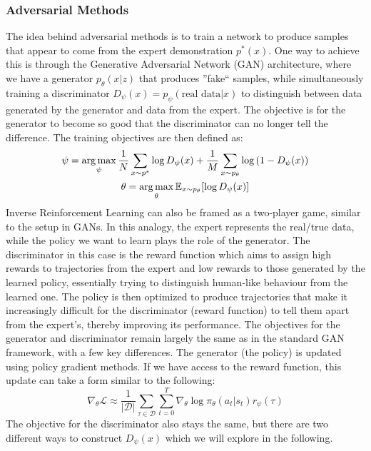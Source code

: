 \subsubsection{Adversarial Methods}
The idea behind adversarial methods is to train a network to produce samples that appear 
to come from the expert demonstration $p^*(x)$. One way to achieve this is through the  
Generative Adversarial Network (GAN) architecture, where we have a generator $p_\theta(x|z)$ that produces 
''fake`` samples, while simultaneously training a discriminator $D_\psi(x) = p_\psi(\text{real data}|x)$ to distinguish between 
data generated by the generator and data from the expert. The objective is for the generator to 
become so good that the discriminator can no longer tell the difference. The training objectives are then defined as:
\begin{gather*}
    \psi = \operatorname*{arg\,max}\limits_\psi \frac{1}{N} \sum_{x\sim p^*} \log{D_\psi(x)} + \frac{1}{M} \sum_{x\sim p_\theta}\log{(1-D_\psi(x))} \\
    \theta = \operatorname*{arg\,max}\limits_\theta \mathbb{E}_{x\sim p_\theta}[\log{D_\psi(x)}]
\end{gather*}
Inverse Reinforcement Learning can also be framed as a two-player game, similar to the setup
in GANs. In this analogy, the expert represents the real/true data, while the policy we want to learn
plays the role of the generator. The discriminator in this case is the reward function which aims to 
assign high rewards to trajectories from the expert and low rewards to those generated by the learned policy,
essentially trying to distinguish human-like behaviour from the learned one. The policy is then optimized to
produce trajectories that make it increasingly difficult for the discriminator (reward function) to 
tell them apart from the expert’s, thereby improving its performance. The objectives for the generator and discriminator
remain largely the same as in the standard GAN framework, with a few key differences. The generator (the policy) is updated 
using policy gradient methods. If we have access to the reward function, this update can take a form similar to the following:
$$\nabla_\theta \mathcal{L} \approx    \frac{1}{|\mathcal{D}|} \sum_{\tau \in \mathcal{D}} \sum_{t=0}^{T} \nabla_{\theta} 
    \log \pi_{\theta}(a_t |s_t) r_\psi(\tau) $$
The objective for the discriminator also stays the same, but there are two different ways to construct $D_\psi(x)$ which we will 
explore in the following.

